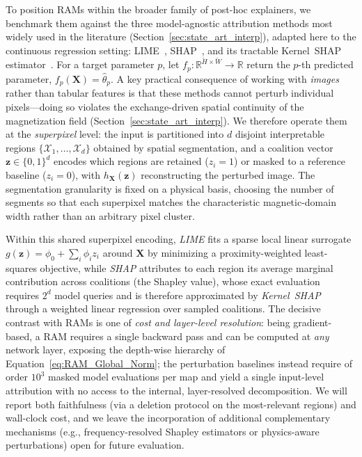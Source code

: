 \documentclass[letterpaper, 12, one column]{article}
\begin{document}
To position RAMs within the broader family of post-hoc explainers, we benchmark them against the three model-agnostic attribution methods most widely used in the literature (Section~\ref{sec:state_art_interp}), adapted here to the continuous regression setting: LIME~\cite{ribeiro2016should}, SHAP~\cite{lundberg2017unified}, and its tractable Kernel~SHAP estimator~\cite{lundberg2017unified}. For a target parameter $p$, let $f_p:\mathbb{R}^{\breve H\times\breve W}\!\rightarrow\mathbb{R}$ return the $p$-th predicted parameter, $f_p(\mathbf{X})=\hat\theta_p$. A key practical consequence of working with \emph{images} rather than tabular features is that these methods cannot perturb individual pixels---doing so violates the exchange-driven spatial continuity of the magnetization field (Section~\ref{sec:state_art_interp}). We therefore operate them at the \emph{superpixel} level: the input is partitioned into $d$ disjoint interpretable regions $\{\mathcal{X}_1,\dots,\mathcal{X}_d\}$ obtained by spatial segmentation, and a coalition vector $\mathbf{z}\in\{0,1\}^d$ encodes which regions are retained ($z_i=1$) or masked to a reference baseline ($z_i=0$), with $h_{\mathbf{X}}(\mathbf{z})$ reconstructing the perturbed image. The segmentation granularity is fixed on a physical basis, choosing the number of segments so that each superpixel matches the characteristic magnetic-domain width rather than an arbitrary pixel cluster.

Within this shared superpixel encoding, \emph{LIME} fits a sparse local linear surrogate $g(\mathbf{z})=\phi_0+\sum_i \phi_i z_i$ around $\mathbf{X}$ by minimizing a proximity-weighted least-squares objective, while \emph{SHAP} attributes to each region its average marginal contribution across coalitions (the Shapley value), whose exact evaluation requires $2^{d}$ model queries and is therefore approximated by \emph{Kernel~SHAP} through a weighted linear regression over sampled coalitions. The decisive contrast with RAMs is one of \emph{cost and layer-level resolution}: being gradient-based, a RAM requires a single backward pass and can be computed at \emph{any} network layer, exposing the depth-wise hierarchy of Equation~\ref{eq:RAM_Global_Norm}; the perturbation baselines instead require of order $10^3$ masked model evaluations per map and yield a single input-level attribution with no access to the internal, layer-resolved decomposition. We will report both faithfulness (via a deletion protocol on the most-relevant regions) and wall-clock cost, and we leave the incorporation of additional complementary mechanisms (e.g., frequency-resolved Shapley estimators or physics-aware perturbations) open for future evaluation.
\end{document}
